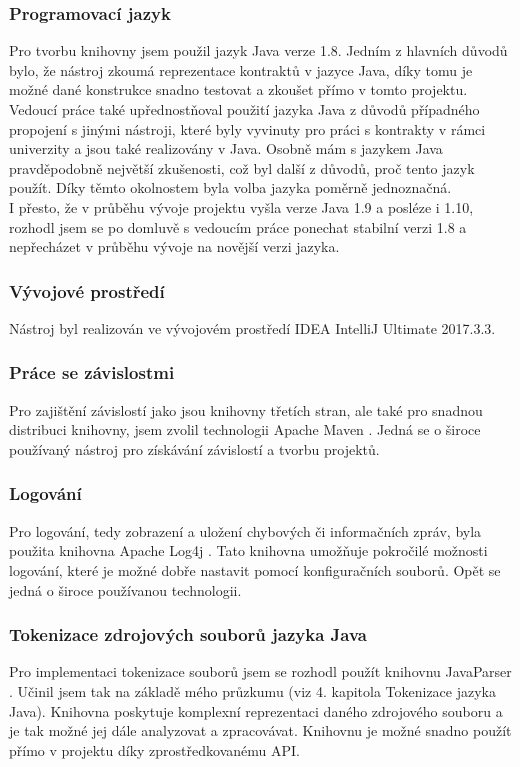 	    	\subsubsection{Programovací jazyk}
				Pro tvorbu knihovny jsem použil jazyk Java verze 1.8. Jedním z hlavních důvodů bylo, že nástroj zkoumá reprezentace kontraktů v jazyce Java, díky tomu je možné dané konstrukce snadno testovat a zkoušet přímo v tomto projektu. Vedoucí práce také upřednostňoval použití jazyka Java z důvodů případného propojení s jinými nástroji, které byly vyvinuty pro práci s kontrakty v rámci univerzity a jsou také realizovány v Java. Osobně mám s jazykem Java pravděpodobně největší zkušenosti, což byl další z důvodů, proč tento jazyk použít. Díky těmto okolnostem byla volba jazyka poměrně jednoznačná.\\
				
				I přesto, že v průběhu vývoje projektu vyšla verze Java 1.9 a posléze i 1.10, rozhodl jsem se po domluvě s vedoucím práce ponechat stabilní verzi 1.8 a nepřecházet v průběhu vývoje na novější verzi jazyka.
				
			\subsubsection{Vývojové prostředí}				
				Nástroj byl realizován ve vývojovém prostředí IDEA IntelliJ Ultimate 2017.3.3.
	    	
			\subsubsection{Práce se závislostmi}
				Pro zajištění závislostí jako jsou knihovny třetích stran, ale také pro snadnou distribuci knihovny, jsem zvolil technologii Apache Maven \cite{maven}. Jedná se o široce používaný nástroj pro získávání závislostí a tvorbu projektů.
				
			\subsubsection{Logování}
				Pro logování, tedy zobrazení a uložení chybových či informačních zpráv, byla použita knihovna Apache Log4j \cite{log4j}. Tato knihovna umožňuje pokročilé možnosti logování, které je možné dobře nastavit pomocí konfiguračních souborů. Opět se jedná o široce používanou technologii.
				
			\subsubsection{Tokenizace zdrojových souborů jazyka Java}
				Pro implementaci tokenizace souborů jsem se rozhodl použít knihovnu JavaParser \cite{javaparser}. Učinil jsem tak na základě mého průzkumu (viz 4. kapitola Tokenizace jazyka Java). Knihovna poskytuje komplexní reprezentaci daného zdrojového souboru a je tak možné jej dále analyzovat a zpracovávat. Knihovnu je možné snadno použít přímo v projektu díky zprostředkovanému API.
			
